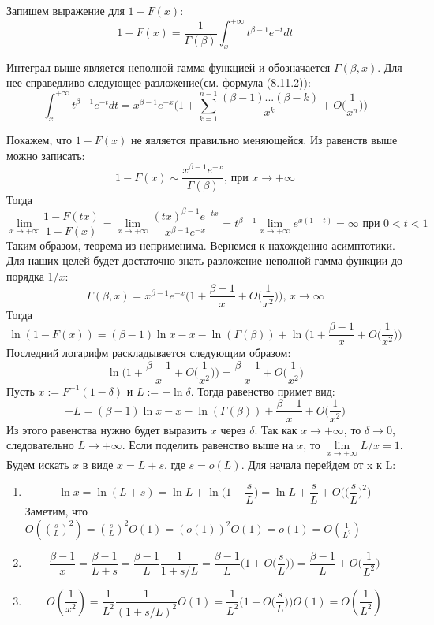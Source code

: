 \documentclass[12pt]{article}
\theoremstyle{plain}
\theoremstyle{definition}
\theoremstyle{remark}
\begin{document}
Запишем выражение для $1-F(x)$:\\
\[
    1-F(x) = \frac{1}{\Gamma(\beta)}\int_x^{+\infty}t^{\beta - 1}e^{-t}dt
\]

Интеграл выше является неполной гамма функцией и обозначается $\Gamma(\beta, x)$. Для нее справедливо следующее разложение(см. \cite{метка4} формула  (8.11.2)):
\[
    \int_x^{+\infty}t^{\beta - 1}e^{-t}dt = x^{\beta - 1}e^{-x}\bigg(1+ \sum_{k=1}^{n-1}\frac{(\beta - 1)...(\beta-k)}{x^k} + O\bigg(\frac{1}{x^n}\bigg)\bigg)
\] 

Покажем, что $1-F(x)$ не является правильно меняющейся. Из равенств выше можно записать: 
\[
    1-F(x) \sim \frac{x^{\beta-1}e^{-x}}{\Gamma(\beta)} \text{, при } x \to +\infty
\]
Тогда 
\[
    \underset{x\to +\infty}{\lim}\frac{1-F(tx)}{1-F(x)} = \underset{x\to +\infty}{\lim}\frac{(tx)^{\beta-1}e^{-tx}}{x^{\beta-1}e^{-x}} = t^{\beta-1} \underset{x\to +\infty}{\lim}e^{x(1-t)} = \infty \text{ при } 0<t<1
\]
Таким образом, теорема из \cite{метка0} неприменима. Вернемся к нахождению асимптотики. Для наших целей будет достаточно знать разложение неполной гамма функции до порядка 1/$x$:
\[
    \Gamma(\beta, x) = x^{\beta-1}e^{-x}\bigg(1+\frac{\beta-1}{x} + O\bigg(\frac{1}{x^2}\bigg)\bigg) \text{, } x\to \infty
\]
Тогда 
\[
    \ln(1-F(x))=(\beta-1)\ln x -x - \ln(\Gamma(\beta)) + \ln \bigg(1+\frac{\beta-1}{x}+ O\bigg(\frac{1}{x^2}\bigg)\bigg)
\]
Последний логарифм раскладывается следующим образом:
\[
    \ln \bigg(1+\frac{\beta-1}{x}+ O\bigg(\frac{1}{x^2}\bigg)\bigg) = \frac{\beta-1}{x} + O\bigg(\frac{1}{x^2}\bigg)
\]
Пусть $x := F^{-1}(1-\delta)$ и $L := -\ln\delta$. Тогда равенство примет вид:
\begin{equation}
    -L = (\beta-1)\ln x -x - \ln(\Gamma(\beta)) + \frac{\beta-1}{x} + O\bigg(\frac{1}{x^2}\bigg)
\end{equation}
Из этого равенства нужно будет выразить $x$ через $\delta$. Так как $x \to +\infty$, то $\delta \to 0$, следовательно $L \to +\infty$. Если поделить равенство выше на $x$, то $\underset{x\to +\infty}{\lim}L/x = 1$. Будем искать $x$ в виде $x = L + s$, где $s = o(L)$. Для начала перейдем от x к L:
\begin{enumerate}
    \item \[
        \ln x=\ln(L+s)=\ln L + \ln\bigg(1+\frac{s}{L}\bigg)=\ln L+\frac{s}{L} + O\bigg(\bigg(\frac{s}{L}\bigg)^2\bigg)
    \]
    Заметим, что $O((\frac{s}{L})^2) = (\frac{s}{L})^2O(1) = (o(1))^2O(1)=o(1)=O(\frac{1}{L^2})$
    \item \[
        \frac{\beta - 1}{x} = \frac{\beta-1}{L+s}=\frac{\beta-1}{L}\frac{1}{1+s/L} =\frac{\beta-1}{L}\bigg(1+O\bigg(\frac{s}{L}\bigg)\bigg) = \frac{\beta-1}{L} + O\bigg(\frac{1}{L^2}\bigg)
    \]
    \item \[
        O(\frac{1}{x^2})=\frac{1}{L^2}\frac{1}{(1+s/L)^2}O(1) = \frac{1}{L^2}\bigg(1+O\bigg(\frac{s}{L}\bigg)\bigg)O(1)=O(\frac{1}{L^2})
    \]
\end{enumerate}
\end{document}
